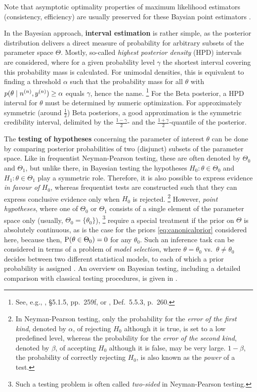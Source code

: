 Note that asymptotic optimality properties of maximum likelihood estimators (consistency, efficiency)
are usually preserved for these Baysian point estimators \parencite[e.g.,][Note~1.8.4, pp.~48f]{2007:robert}.

In the Bayesian approach, \textbf{interval estimation} is rather simple,
as the posterior distribution delivers a direct measure of probability for arbitrary subsets of the parameter space $\Theta$.
Mostly, so-called \emph{highest posterior density} (HPD) intervals are considered,
where for a given probability level $\gamma$ the shortest interval covering this probability mass is calculated.
For unimodal densities, this is equivalent to finding a threshold $\alpha$ such that
the probability mass for all $\theta$ with $p(\theta\mid n^{(n)}, y^{(n)}) \ge \alpha$ equals $\gamma$, hence the name.%
\footnote{See, e.g., \textcite{2000:bernardosmith}, \S 5.1.5, pp.~259f, or \textcite{2007:robert}, Def.~5.5.3, p.~260.}
For the Beta posterior, a HPD interval for $\theta$ must be determined by numeric optimization.
For approximately symmetric (around $\frac{1}{2}$) Beta posteriors, a good approximation is the symmetric credibility interval,
delimited by the $\frac{1-\gamma}{2}$- and the $\frac{1+\gamma}{2}$-quantile of the posterior.

The \textbf{testing of hypotheses} concerning the parameter of interest $\theta$ can be done
by comparing posterior probabilities of two (disjunct) subsets of the parameter space.
Like in frequentist Neyman-Pearson testing, these are often denoted by $\Theta_0$ and $\Theta_1$,
but unlike there, in Bayesian testing the hypotheses $H_0: \theta \in \Theta_0$ and $H_1: \theta \in \Theta_1$ play a symmetric role.
Therefore, it is also possible to express evidence \emph{in favour of} $H_0$,
whereas frequentist tests are constructed such that they can express conclusive evidence only when $H_0$ is rejected.%
\footnote{In Neyman-Pearson testing, only the probability
for the \emph{error of the first kind}, denoted by $\alpha$, of rejecting $H_0$ although it is true, is set to a low predefined level,
whereas the probability for the \emph{error of the second kind}, denoted by $\beta$, of accepting $H_0$ although it is false, may be very large.
$1-\beta$, the probability of correctly rejecting $H_0$, is also known as the \emph{power} of a test.}
However, \emph{point hypotheses}, where one of $\Theta_0$ or $\Theta_1$
consists of a single element of the parameter space only (usually, $\Theta_0 = \{\theta_0\}$),%
\footnote{Such a testing problem is often called \emph{two-sided} in Neyman-Pearson testing.}
require a special treatment if the prior on $\Theta$ is absolutely continuous,
as is the case for the priors \eqref{eq:canonicalprior} considered here,
because then, $\operatorname{P}(\theta \in \Theta_0) = 0$ for any $\theta_0$.
Such an inference task can be considered in terms of a problem of \emph{model selection},
where $\theta = \theta_0$ vs.\ $\theta \neq \theta_0$ decides between two different statistical models,
to each of which a prior probability is assigned \parencite[e.g.,][\S 5.2.4]{2007:robert}.
An overview on Bayesian testing, including a detailed comparison with classical testing procedures,
is given in \textcite[\S 5.2--5.4]{2007:robert}.

